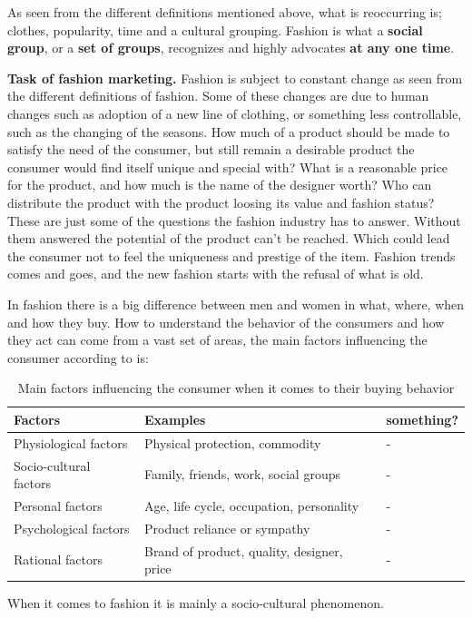As seen from the different definitions mentioned above, what is reoccurring is;
clothes, popularity, time and a cultural grouping. Fashion is what a \textbf{social group}, or a \textbf{set of groups}, recognizes and highly advocates \textbf{at any one time}.

\textbf{Task of fashion marketing.}
Fashion is subject to constant change as seen from the different definitions of fashion.
Some of these changes are due to human changes such as adoption of a new line of clothing, or something less controllable, such as the changing of the seasons.
How much of a product should be made to satisfy the need of the consumer, but still remain a desirable product the consumer would find itself unique and special with?
What is a reasonable price for the product, and how much is the name of the designer worth?
Who can distribute the product with the product loosing its value and fashion status?
These are just some of the questions the fashion industry has to answer.
Without them answered the potential of the product can't be reached.
Which could lead the consumer not to feel the uniqueness and prestige of the item.
Fashion trends comes and goes, and the new fashion starts with the refusal of what is old.


In fashion there is a big difference between men and women in what, where, when
and how they buy.  How to understand the behavior of the consumers and how they
act can come from a vast set of areas, the main factors influencing the consumer according to \cite{kotler2009marketing} is:

\begin{table}[H]
    \centering
    \begin{tabular}{l|l|l}
      \textbf{Factors}        & \textbf{Examples} & \textbf{something?} \\ \hline
      Physiological factors   & Physical protection, commodity & - \\ \hline
      Socio-cultural factors  & Family, friends, work, social groups & - \\ \hline
      Personal factors        & Age, life cycle, occupation, personality & - \\ \hline
      Psychological factors   & Product reliance or sympathy & - \\ \hline %
      Rational factors        & Brand of product, quality, designer, price & - \\
    \end{tabular}
    \label{table:FashionFactors}
    \caption [Fashion Factors]{Main factors influencing the consumer when it comes to their buying behavior}
\end{table}
When it comes to fashion it is mainly a socio-cultural phenomenon.

